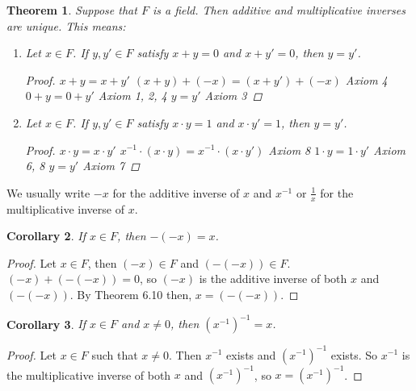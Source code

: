 \documentclass[12pt]{article}
\renewcommand{\_}[1]{\underline{ #1 }}
\newtheorem{theorem}{Theorem}[section]
\newtheorem{corollary}[theorem]{Corollary}
\theoremstyle{definition}
\numberwithin{equation}{subsection}
\begin{document}
\begin{theorem}  Suppose that $F$ is a field.  Then additive and multiplicative inverses are unique.  This means:
\begin{enumerate}
\item Let $x \in F$.  If $y, y' \in F$ satisfy $x + y = 0$ and $x + y' = 0$, then $y = y'$.
\begin{proof}
$x + y = x + y'$ \newline
$(x + y) + (-x) = (x + y') + (-x)$ Axiom 4 \newline
$0 + y = 0 + y'$ Axiom 1, 2, 4 \newline
$y = y'$ Axiom 3

\end{proof}
\item Let $x \in F$.  If $y, y' \in F$ satisfy $x \cdot y = 1$ and $x \cdot y' = 1$, then $y = y'$.
\begin{proof}
$x \cdot y = x \cdot y'$ \newline
$x^{-1} \cdot (x \cdot y) = x^{-1} \cdot (x \cdot y')$ Axiom 8 \newline
$1 \cdot y = 1 \cdot y'$ Axiom 6, 8 \newline
$y = y'$ Axiom 7
\end{proof}
\end{enumerate}
\end{theorem}



\noindent  We usually write $-x$ for the additive inverse of $x$ and $x^{-1}$ or $\frac{1}{x}$ for the multiplicative inverse of $x$.

\begin{corollary}  If $x\in F$, then $-(-x)=x$.
\end{corollary}

\begin{proof}
Let $x \in F$, then $(-x) \in F$ and $(-(-x)) \in F$. $(-x) + (-(-x)) = 0$, so $(-x)$ is the additive inverse of both $x$ and $(-(-x))$. By Theorem 6.10 then, $x = (-(-x))$.
\end{proof}

\begin{corollary}  If $x\in F$ and $x\neq 0$, then $(x^{-1})^{-1}=x$.
\end{corollary}

\begin{proof}
Let $x \in F$ such that $x \not = 0$. Then $x^{-1}$ exists and $(x^{-1})^{-1}$ exists. So $x^{-1}$ is the multiplicative inverse of both $x$ and $(x^{-1})^{-1}$, so $x = (x^{-1})^{-1}$.
\end{proof}
\end{document}
